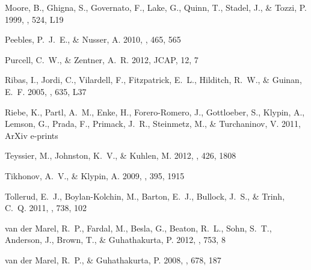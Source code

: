 \documentclass{emulateapj}
\begin{document}
\begin{thebibliography}{25}
{Moore}, B., {Ghigna}, S., {Governato}, F., {Lake}, G., {Quinn}, T., {Stadel},
  J., \& {Tozzi}, P. 1999, \apjl, 524, L19

{Peebles}, P.~J.~E., \& {Nusser}, A. 2010, \nat, 465, 565

{Purcell}, C.~W., \& {Zentner}, A.~R. 2012, {JCAP}, 12, 7

{Ribas}, I., {Jordi}, C., {Vilardell}, F., {Fitzpatrick}, E.~L., {Hilditch},
  R.~W., \& {Guinan}, E.~F. 2005, \apjl, 635, L37

{Riebe}, K., {Partl}, A.~M., {Enke}, H., {Forero-Romero}, J., {Gottloeber}, S.,
  {Klypin}, A., {Lemson}, G., {Prada}, F., {Primack}, J.~R., {Steinmetz}, M.,
  \& {Turchaninov}, V. 2011, ArXiv e-prints

{Teyssier}, M., {Johnston}, K.~V., \& {Kuhlen}, M. 2012, \mnras, 426, 1808

{Tikhonov}, A.~V., \& {Klypin}, A. 2009, \mnras, 395, 1915

{Tollerud}, E.~J., {Boylan-Kolchin}, M., {Barton}, E.~J., {Bullock}, J.~S., \&
  {Trinh}, C.~Q. 2011, \apj, 738, 102

{van der Marel}, R.~P., {Fardal}, M., {Besla}, G., {Beaton}, R.~L., {Sohn},
  S.~T., {Anderson}, J., {Brown}, T., \& {Guhathakurta}, P. 2012, \apj, 753, 8

{van der Marel}, R.~P., \& {Guhathakurta}, P. 2008, \apj, 678, 187

\end{thebibliography}
\end{document}
